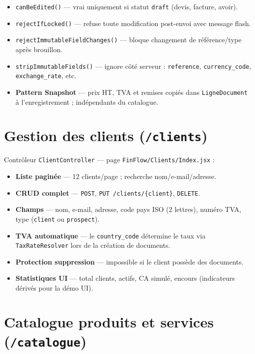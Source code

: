 \documentclass[11pt,a4paper]{report}
\newcommand{\route}[1]{\texttt{\small #1}}
\newcommand{\ctrl}[1]{\texttt{\small #1}}
\newcommand{\svc}[1]{\texttt{\small #1}}
\newcommand{\model}[1]{\texttt{\small #1}}
\newcommand{\feat}[1]{\textbf{#1}}
\begin{document}
\begin{itemize}[leftmargin=*]
    \item \texttt{canBeEdited()} — vrai uniquement si statut \texttt{draft} (devis, facture, avoir).
    \item \texttt{rejectIfLocked()} — refuse toute modification post-envoi avec message flash.
    \item \texttt{rejectImmutableFieldChanges()} — bloque changement de référence/type après brouillon.
    \item \texttt{stripImmutableFields()} — ignore côté serveur : \texttt{reference}, \texttt{currency\_code}, \texttt{exchange\_rate}, etc.
    \item \textbf{Pattern Snapshot} — prix HT, TVA et remises copiés dans \model{LigneDocument} à l'enregistrement ; indépendants du catalogue.
\end{itemize}

\section{Gestion des clients (\route{/clients})}

Contrôleur \ctrl{ClientController} — page \texttt{FinFlow/Clients/Index.jsx} :

\begin{itemize}[leftmargin=*]
    \item \feat{Liste paginée} — 12 clients/page ; recherche nom/e-mail/adresse.
    \item \feat{CRUD complet} — \route{POST}, \route{PUT /clients/\{client\}}, \route{DELETE}.
    \item \feat{Champs} — nom, e-mail, adresse, code pays ISO (2 lettres), numéro TVA, type (\texttt{client} ou \texttt{prospect}).
    \item \feat{TVA automatique} — le \texttt{country\_code} détermine le taux via \svc{TaxRateResolver} lors de la création de documents.
    \item \feat{Protection suppression} — impossible si le client possède des documents.
    \item \feat{Statistiques UI} — total clients, actifs, CA simulé, encours (indicateurs dérivés pour la démo UI).
\end{itemize}

\section{Catalogue produits et services (\route{/catalogue})}
\end{document}
